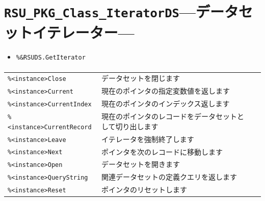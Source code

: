 \section{\texttt{RSU\_PKG\_Class\_IteratorDS}\;---\;データセットイテレーター\;---}\label{sec:RSU_PKG_Class_IteratorDS}
\paragraph{\DocStrTitleClassCreationFunction}
\begin{itemize}
\item\texttt{\%\&RSUDS.GetIterator}
\end{itemize}
\paragraph{\DocStrTitleClassFunctionList}
\begin{center}
{\footnotesize
\begin{xltabular}{\textwidth}{|p{3.5truecm}|X|p{1.5truecm}|}
\hline
\thead{\DocStrHeaderFunctionName}&\thead{\DocStrDescription}&\thead{\DocStrRefto}\\
\hline
\hline
\texttt{\%<instance>Close}&データセットを閉じます&\\
\hline
\texttt{\%<instance>Current}&現在のポインタの指定変数値を返します&\\
\hline
\texttt{\%<instance>CurrentIndex}&現在のポインタのインデックス返します&\\
\hline
\texttt{\%<instance>CurrentRecord}&現在のポインタのレコードをデータセットとして切り出します&\\
\hline
\texttt{\%<instance>Leave}&イテレータを強制終了します&\\
\hline
\texttt{\%<instance>Next}&ポインタを次のレコードに移動します&\\
\hline
\texttt{\%<instance>Open}&データセットを開きます&\\
\hline
\texttt{\%<instance>QueryString}&関連データセットの定義クエリを返します&\\
\hline
\texttt{\%<instance>Reset}&ポインタのリセットします&\\
\hline
\end{xltabular}
}
\end{center}
